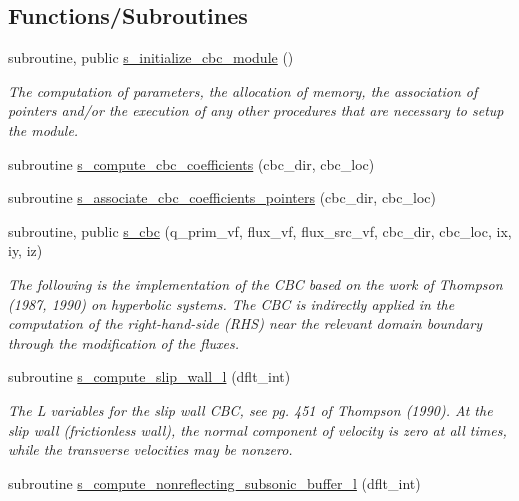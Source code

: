 \subsection*{Functions/\+Subroutines}
\begin{DoxyCompactItemize}
\item 
subroutine, public \hyperlink{namespacem__cbc_a0afb287e68b0d1d970fd073849525c36}{s\+\_\+initialize\+\_\+cbc\+\_\+module} ()
\begin{DoxyCompactList}\small\item\em The computation of parameters, the allocation of memory, the association of pointers and/or the execution of any other procedures that are necessary to setup the module. \end{DoxyCompactList}\item 
subroutine \hyperlink{namespacem__cbc_aee8ead62642bc2783deb6403a961679d}{s\+\_\+compute\+\_\+cbc\+\_\+coefficients} (cbc\+\_\+dir, cbc\+\_\+loc)
\item 
subroutine \hyperlink{namespacem__cbc_a76e19dea2a654c9a7f311baa16ef118c}{s\+\_\+associate\+\_\+cbc\+\_\+coefficients\+\_\+pointers} (cbc\+\_\+dir, cbc\+\_\+loc)
\item 
subroutine, public \hyperlink{namespacem__cbc_a72cc3ba5a0de327fae70742734e77492}{s\+\_\+cbc} (q\+\_\+prim\+\_\+vf, flux\+\_\+vf, flux\+\_\+src\+\_\+vf, cbc\+\_\+dir, cbc\+\_\+loc, ix, iy, iz)
\begin{DoxyCompactList}\small\item\em The following is the implementation of the C\+BC based on the work of Thompson (1987, 1990) on hyperbolic systems. The C\+BC is indirectly applied in the computation of the right-\/hand-\/side (R\+HS) near the relevant domain boundary through the modification of the fluxes. \end{DoxyCompactList}\item 
subroutine \hyperlink{namespacem__cbc_ad51ac21554842928259732d09a7eaf51}{s\+\_\+compute\+\_\+slip\+\_\+wall\+\_\+l} (dflt\+\_\+int)
\begin{DoxyCompactList}\small\item\em The L variables for the slip wall C\+BC, see pg. 451 of Thompson (1990). At the slip wall (frictionless wall), the normal component of velocity is zero at all times, while the transverse velocities may be nonzero. \end{DoxyCompactList}\item 
subroutine \hyperlink{namespacem__cbc_a39d803573d65c9c8ba7cc8b44b8053e1}{s\+\_\+compute\+\_\+nonreflecting\+\_\+subsonic\+\_\+buffer\+\_\+l} (dflt\+\_\+int)

\end{DoxyCompactItemize}
